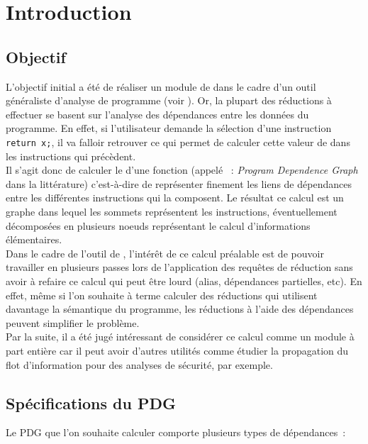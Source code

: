 \chapter{Introduction}

\section{Objectif}

L'objectif initial a été de réaliser un module de \slicing
dans le cadre d'un outil généraliste d'analyse de programme (voir
\cite{ppcSlicing}).
Or, la plupart des réductions à effectuer se basent sur l'analyse des
dépendances entre les données du programme.
En effet, si l'utilisateur demande la sélection
d'une instruction \verb!return x;!, il va falloir retrouver ce qui permet de
calculer cette valeur de  dans les instructions qui précèdent.\\

Il s'agit donc de calculer le  d'une fonction
(appelé ~: {\it Program Dependence Graph} dans la littérature)
c'est-à-dire de représenter finement les liens de
dépendances entre les différentes instructions qui la composent.
Le résultat ce calcul est un graphe dans lequel les sommets
représentent les instructions,
éventuellement décomposées en plusieurs noeuds représentant
le calcul d'informations élémentaires.\\

Dans le cadre de l'outil de \slicing,
l'intérêt de ce calcul préalable est de pouvoir
travailler en plusieurs passes lors de l'application des
requêtes de réduction sans avoir à
refaire ce calcul qui peut être lourd (alias, dépendances partielles, etc). En
effet, même si l'on souhaite à terme calculer des réductions qui utilisent
davantage la sémantique du programme, les réductions à l'aide des dépendances
peuvent simplifier le problème.\\

Par la suite, il a été jugé intéressant de considérer ce calcul
comme un module à part entière car il peut avoir d'autres
utilités comme étudier la
propagation du flot d'information pour des analyses de sécurité, par exemple.

\section{Spécifications du PDG}\label{sec-flot}

Le PDG que l'on souhaite calculer comporte plusieurs types de dépendances~:

